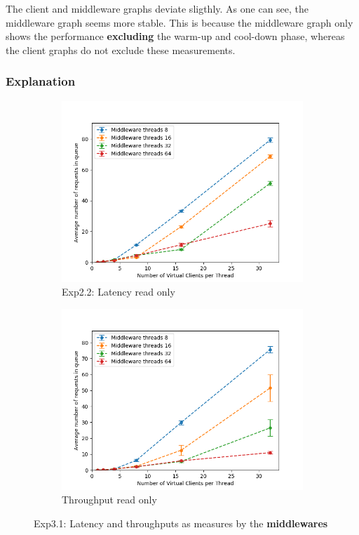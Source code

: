 \documentclass[11pt,a4paper]{article}
\begin{document}


The client and middleware graphs deviate sligthly.
As one can see, the middleware graph seems more stable.
This is because the middleware graph only shows the performance \textbf{excluding} the warm-up and cool-down phase, whereas the client graphs do not exclude these measurements.

\subsubsection{Explanation}


\begin{figure}[H]
\centering
\begin{subfigure}{.5\textwidth}
    \centering
    \includegraphics[width=\textwidth]{img/exp3_2/exp3_2__queuesize_middleware_write_0.png}
    \caption{Exp2.2: Latency read only}
    \label{fig:mesh1}
\end{subfigure}%
\begin{subfigure}{.5\textwidth}
      \centering
    \includegraphics[width=\textwidth]{img/exp3_2/exp3_2__queuesize_middleware_write_1.png}
    \caption{Throughput read only}
    \label{fig:mesh1}
\end{subfigure}
\caption{Exp3.1: Latency and throughputs as measures by the \textbf{middlewares}}
\label{fig:test}
\end{figure}
\end{document}
